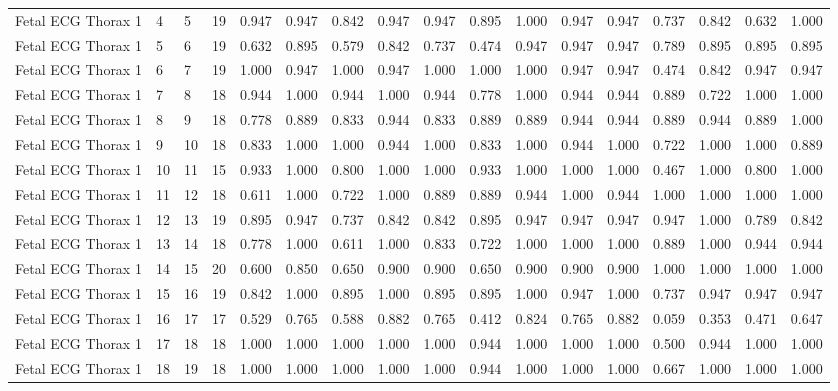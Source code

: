 \begin{longtable}{lllllllllllllllll}
Fetal ECG Thorax 1 & 4 & 5 & 19 & 0.947 & 0.947 & 0.842 & 0.947 & 0.947 & 0.895 & 1.000 & 0.947 & 0.947 & 0.737 & 0.842 & 0.632 & 1.000 \\
Fetal ECG Thorax 1 & 5 & 6 & 19 & 0.632 & 0.895 & 0.579 & 0.842 & 0.737 & 0.474 & 0.947 & 0.947 & 0.947 & 0.789 & 0.895 & 0.895 & 0.895 \\
Fetal ECG Thorax 1 & 6 & 7 & 19 & 1.000 & 0.947 & 1.000 & 0.947 & 1.000 & 1.000 & 1.000 & 0.947 & 0.947 & 0.474 & 0.842 & 0.947 & 0.947 \\
Fetal ECG Thorax 1 & 7 & 8 & 18 & 0.944 & 1.000 & 0.944 & 1.000 & 0.944 & 0.778 & 1.000 & 0.944 & 0.944 & 0.889 & 0.722 & 1.000 & 1.000 \\
Fetal ECG Thorax 1 & 8 & 9 & 18 & 0.778 & 0.889 & 0.833 & 0.944 & 0.833 & 0.889 & 0.889 & 0.944 & 0.944 & 0.889 & 0.944 & 0.889 & 1.000 \\
Fetal ECG Thorax 1 & 9 & 10 & 18 & 0.833 & 1.000 & 1.000 & 0.944 & 1.000 & 0.833 & 1.000 & 0.944 & 1.000 & 0.722 & 1.000 & 1.000 & 0.889 \\
Fetal ECG Thorax 1 & 10 & 11 & 15 & 0.933 & 1.000 & 0.800 & 1.000 & 1.000 & 0.933 & 1.000 & 1.000 & 1.000 & 0.467 & 1.000 & 0.800 & 1.000 \\
Fetal ECG Thorax 1 & 11 & 12 & 18 & 0.611 & 1.000 & 0.722 & 1.000 & 0.889 & 0.889 & 0.944 & 1.000 & 0.944 & 1.000 & 1.000 & 1.000 & 1.000 \\
Fetal ECG Thorax 1 & 12 & 13 & 19 & 0.895 & 0.947 & 0.737 & 0.842 & 0.842 & 0.895 & 0.947 & 0.947 & 0.947 & 0.947 & 1.000 & 0.789 & 0.842 \\
Fetal ECG Thorax 1 & 13 & 14 & 18 & 0.778 & 1.000 & 0.611 & 1.000 & 0.833 & 0.722 & 1.000 & 1.000 & 1.000 & 0.889 & 1.000 & 0.944 & 0.944 \\
Fetal ECG Thorax 1 & 14 & 15 & 20 & 0.600 & 0.850 & 0.650 & 0.900 & 0.900 & 0.650 & 0.900 & 0.900 & 0.900 & 1.000 & 1.000 & 1.000 & 1.000 \\
Fetal ECG Thorax 1 & 15 & 16 & 19 & 0.842 & 1.000 & 0.895 & 1.000 & 0.895 & 0.895 & 1.000 & 0.947 & 1.000 & 0.737 & 0.947 & 0.947 & 0.947 \\
Fetal ECG Thorax 1 & 16 & 17 & 17 & 0.529 & 0.765 & 0.588 & 0.882 & 0.765 & 0.412 & 0.824 & 0.765 & 0.882 & 0.059 & 0.353 & 0.471 & 0.647 \\
Fetal ECG Thorax 1 & 17 & 18 & 18 & 1.000 & 1.000 & 1.000 & 1.000 & 1.000 & 0.944 & 1.000 & 1.000 & 1.000 & 0.500 & 0.944 & 1.000 & 1.000 \\
Fetal ECG Thorax 1 & 18 & 19 & 18 & 1.000 & 1.000 & 1.000 & 1.000 & 1.000 & 0.944 & 1.000 & 1.000 & 1.000 & 0.667 & 1.000 & 1.000 & 1.000 \\

\end{longtable}
